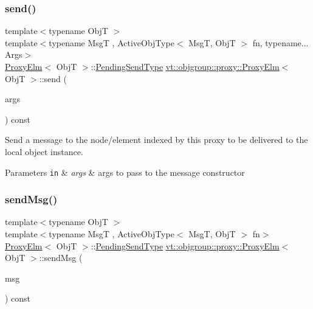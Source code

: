 \subsubsection{\texorpdfstring{send()}{send()}\hspace{0.1cm}{\footnotesize\ttfamily [3/3]}}
{\footnotesize\ttfamily template$<$typename ObjT $>$ \\
template$<$typename MsgT , Active\+Obj\+Type$<$ Msg\+T, Obj\+T $>$ fn, typename... Args$>$ \\
\hyperlink{structvt_1_1objgroup_1_1proxy_1_1_proxy_elm}{Proxy\+Elm}$<$ ObjT $>$\+::\hyperlink{structvt_1_1objgroup_1_1proxy_1_1_proxy_elm_ab0f40d6a0191c974a4f4dd9dec0fc02f}{Pending\+Send\+Type} \hyperlink{structvt_1_1objgroup_1_1proxy_1_1_proxy_elm}{vt\+::objgroup\+::proxy\+::\+Proxy\+Elm}$<$ ObjT $>$\+::send (\begin{DoxyParamCaption}\item[{Args \&\&...}]{args }\end{DoxyParamCaption}) const}



Send a message to the node/element indexed by this proxy to be delivered to the local object instance. 


\begin{DoxyParams}[1]{Parameters}
\mbox{\tt in}  & {\em args} & args to pass to the message constructor \\
\hline
\end{DoxyParams}
\mbox{\label{structvt_1_1objgroup_1_1proxy_1_1_proxy_elm_ad08b5f3df7ea73d8fd11b30225c8f971}} 
\subsubsection{\texorpdfstring{send\+Msg()}{sendMsg()}}
{\footnotesize\ttfamily template$<$typename ObjT $>$ \\
template$<$typename MsgT , Active\+Obj\+Type$<$ Msg\+T, Obj\+T $>$ fn$>$ \\
\hyperlink{structvt_1_1objgroup_1_1proxy_1_1_proxy_elm}{Proxy\+Elm}$<$ ObjT $>$\+::\hyperlink{structvt_1_1objgroup_1_1proxy_1_1_proxy_elm_ab0f40d6a0191c974a4f4dd9dec0fc02f}{Pending\+Send\+Type} \hyperlink{structvt_1_1objgroup_1_1proxy_1_1_proxy_elm}{vt\+::objgroup\+::proxy\+::\+Proxy\+Elm}$<$ ObjT $>$\+::send\+Msg (\begin{DoxyParamCaption}\item[{\hyperlink{structvt_1_1messaging_1_1_msg_ptr_thief}{messaging\+::\+Msg\+Ptr\+Thief}$<$ MsgT $>$}]{msg }\end{DoxyParamCaption}) const}



